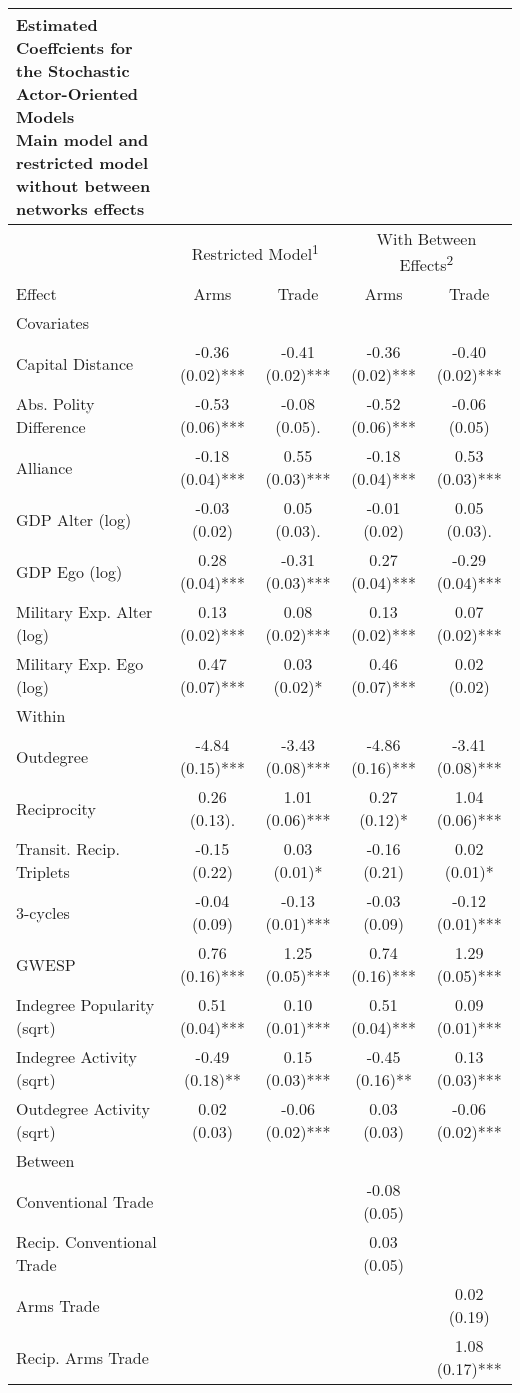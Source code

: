 \captionsetup[table]{labelformat=empty,skip=1pt}
\begin{longtable}{lcccc}
\caption*{
{\large Estimated Coeffcients for the Stochastic Actor-Oriented Models} \\ 
{\small Main model and restricted model without between networks effects}
} \\ 
\toprule
 & \multicolumn{2}{c}{Restricted Model\textsuperscript{1}} & \multicolumn{2}{c}{With Between Effects\textsuperscript{2}} \\ 
 \cmidrule(lr){2-3} \cmidrule(lr){4-5}
Effect & Arms & Trade & Arms & Trade \\ 
\midrule
\multicolumn{1}{l}{Covariates} \\ 
\midrule
Capital Distance & -0.36 (0.02)*** & -0.41 (0.02)*** & -0.36 (0.02)*** & -0.40 (0.02)*** \\ 
Abs. Polity Difference & -0.53 (0.06)*** & -0.08 (0.05).   & -0.52 (0.06)*** & -0.06 (0.05)    \\ 
Alliance & -0.18 (0.04)*** &  0.55 (0.03)*** & -0.18 (0.04)*** &  0.53 (0.03)*** \\ 
GDP Alter (log) & -0.03 (0.02)    &  0.05 (0.03).   & -0.01 (0.02)    &  0.05 (0.03).   \\ 
GDP Ego (log) &  0.28 (0.04)*** & -0.31 (0.03)*** &  0.27 (0.04)*** & -0.29 (0.04)*** \\ 
Military Exp. Alter (log) &  0.13 (0.02)*** &  0.08 (0.02)*** &  0.13 (0.02)*** &  0.07 (0.02)*** \\ 
Military Exp. Ego (log) &  0.47 (0.07)*** &  0.03 (0.02)*   &  0.46 (0.07)*** &  0.02 (0.02)    \\ 
\midrule
\multicolumn{1}{l}{Within} \\ 
\midrule
Outdegree & -4.84 (0.15)*** & -3.43 (0.08)*** & -4.86 (0.16)*** & -3.41 (0.08)*** \\ 
Reciprocity &  0.26 (0.13).   &  1.01 (0.06)*** &  0.27 (0.12)*   &  1.04 (0.06)*** \\ 
Transit. Recip. Triplets & -0.15 (0.22)    &  0.03 (0.01)*   & -0.16 (0.21)    &  0.02 (0.01)*   \\ 
3-cycles & -0.04 (0.09)    & -0.13 (0.01)*** & -0.03 (0.09)    & -0.12 (0.01)*** \\ 
GWESP &  0.76 (0.16)*** &  1.25 (0.05)*** &  0.74 (0.16)*** &  1.29 (0.05)*** \\ 
Indegree Popularity (sqrt) &  0.51 (0.04)*** &  0.10 (0.01)*** &  0.51 (0.04)*** &  0.09 (0.01)*** \\ 
Indegree Activity (sqrt) & -0.49 (0.18)**  &  0.15 (0.03)*** & -0.45 (0.16)**  &  0.13 (0.03)*** \\ 
Outdegree Activity (sqrt) &  0.02 (0.03)    & -0.06 (0.02)*** &  0.03 (0.03)    & -0.06 (0.02)*** \\ 
\midrule
\multicolumn{1}{l}{Between} \\ 
\midrule
Conventional Trade &  &  & -0.08 (0.05)    &  \\ 
Recip. Conventional Trade &  &  &  0.03 (0.05)    &  \\ 
Arms Trade &  &  &  &  0.02 (0.19)    \\ 
Recip. Arms Trade &  &  &  &  1.08 (0.17)*** \\ 
 \bottomrule
\end{longtable}
